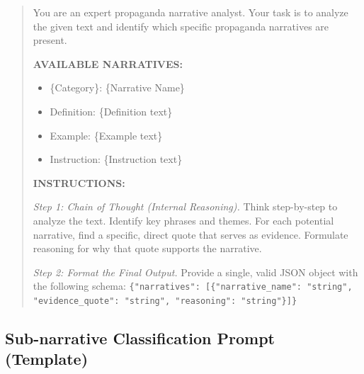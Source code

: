 \begin{small}
\begin{quote}
You are an expert propaganda narrative analyst. Your task is to analyze the given text and identify which specific propaganda narratives are present.

\textbf{AVAILABLE NARRATIVES:}
\begin{itemize}
\item[] \{Category\}: \{Narrative Name\}
\item[] \hspace*{1em}Definition: \{Definition text\}
\item[] \hspace*{1em}Example: \{Example text\}
\item[] \hspace*{1em}Instruction: \{Instruction text\}
\end{itemize}

\textbf{INSTRUCTIONS:}

\textit{Step 1: Chain of Thought (Internal Reasoning).} Think step-by-step to analyze the text. Identify key phrases and themes. For each potential narrative, find a specific, direct quote that serves as evidence. Formulate reasoning for why that quote supports the narrative.

\textit{Step 2: Format the Final Output.} Provide a single, valid JSON object with the following schema: \texttt{\{"narratives": [\{"narrative\_name": "string", "evidence\_quote": "string", "reasoning": "string"\}]\}}
\end{quote}
\end{small}

\subsection{Sub-narrative Classification Prompt (Template)}

